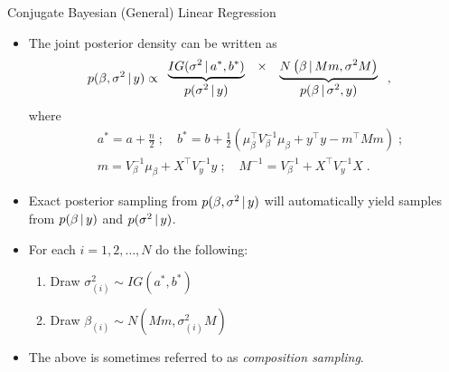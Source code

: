 \begin{frame}{Conjugate Bayesian (General) Linear Regression}
 
\begin{itemize}\setlength{\itemsep}{0.1cm}
 \item The joint posterior density can be written as
\begin{align*}
 p(\beta,\sigma^2 \,|\, y) &\propto
 \begin{array}{ccc}
  \underbrace{IG(\sigma^2\,|\, a^*, b^*)} & \times & \underbrace{N\left(\beta \,|\, Mm, \sigma^2 M\right)}\\
  p(\sigma^2\,|\, y) & & p(\beta\,|\, \sigma^2, y)
 \end{array}\; , 
\end{align*}
where 
\begin{align*}
& a^* = a + \frac{n}{2}\;;\quad b^* = b + \frac{1}{2}\left(\mu_{\beta}^{\top}V_{\beta}^{-1}\mu_{\beta} + y^{\top}y - m^{\top}Mm\right)\;; \\ 
& m = V_{\beta}^{-1}\mu_{\beta} + X^{\top}V_y^{-1}y\;;\quad M^{-1} = V_{\beta}^{-1} + X^{\top} V_y^{-1} X\; .   
\end{align*}

\item Exact posterior sampling from $p(\beta, \sigma^2 \,|\, y)$ will automatically yield samples from $p(\beta\,|\, y)$ and $p(\sigma^2\,|\, y)$.

\item For each $i=1,2,\ldots,N$ do the following: 
 \begin{enumerate}
  \item Draw $\displaystyle \sigma^2_{(i)} \sim IG(a^*,b^*)$
  \item Draw $\displaystyle \beta_{(i)} \sim N\left(Mm, \sigma^2_{(i)}M\right)$
 \end{enumerate}
 
 \item The above is sometimes referred to as \emph{composition sampling}.
\end{itemize}

\end{frame}

